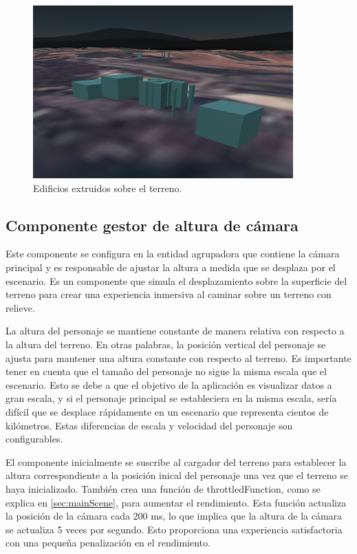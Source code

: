 \documentclass[a4paper, 11pt]{book}
\begin{document}
\begin{figure}[H]
  \centering
  \includegraphics[width=10cm, keepaspectratio]{img/buildings.jpg}
  \caption{Edificios extruidos sobre el terreno.}
  \label{fig:buildings}
\end{figure}
\subsection{Componente gestor de altura de cámara}
\label{subsec:cameraHeight}
Este componente se configura en la entidad agrupadora que contiene la cámara principal y es responsable de ajustar la altura a medida que se desplaza por el escenario. Es un componente que simula el desplazamiento sobre la superficie del terreno para crear una experiencia inmersiva al caminar sobre un terreno con relieve.

La altura del personaje se mantiene constante de manera relativa con respecto a la altura del terreno. En otras palabras, la posición vertical del personaje se ajusta para mantener una altura constante con respecto al terreno.
Es importante tener en cuenta que el tamaño del personaje no sigue la misma escala que el escenario. Esto se debe a que el objetivo de la aplicación es visualizar datos a gran escala, y si el personaje principal se estableciera en la misma escala, sería difícil que se desplace rápidamente en un escenario que representa cientos de kilómetros. Estas diferencias de escala y velocidad del personaje son configurables.

El componente inicialmente se suscribe al cargador del terreno para establecer la altura correspondiente a la posición inical del personaje una vez que el terreno se haya inicializado. También crea una función de throttledFunction, como se explica en \ref{sec:mainScene}, para aumentar el rendimiento. Esta función actualiza la posición de la cámara cada 200 ms, lo que implica que la altura de la cámara se actualiza 5 veces por segundo. Esto proporciona una experiencia satisfactoria con una pequeña penalización en el rendimiento.
\end{document}
